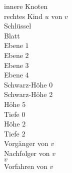 \documentclass[a4paper,12pt]{article}
\begin{document}
innere Knoten\\
rechtes Kind $u$ von $v$\\
Schlüssel\\
Blatt\\
Ebene $1$ \\
Ebene $2$ \\  
Ebene $3$ \\  
Ebene $4$ \\
Schwarz-Höhe 0\\
Schwarz-Höhe 2\\
Höhe $5$\\
Tiefe $0$\\
Höhe $2$\\
Tiefe $2$\\
Vorgänger von $v$\\
Nachfolger von $v$\\
$v$\\

\color{Blue}
Vorfahren von $v$


\newpage


\end{document}
